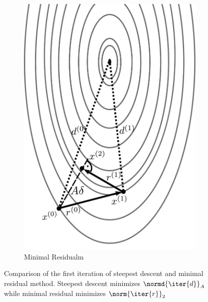\begin{figure}
\begin{subfigure}{.5\textwidth}
  \includegraphics[width=0.9\linewidth]{chapters/3_solvers/3_2_iterative_solvers/figures/mr.pdf}
  \caption{Minimal Residualm}
  \label{fig:mr}
\end{subfigure}
\caption{Comparison of the first iteration of steepest descent and minimal residual method. Steepest descent minimizes $\normd{\iter{d}}_A$ while minimal residual minimizes $\norm{\iter{r}}_2$}
\label{fig:one_d_projections}
\end{figure}


